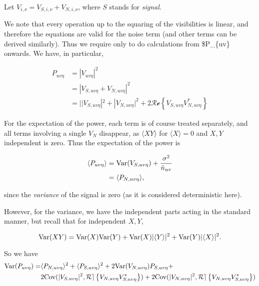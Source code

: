 \documentclass[11pt]{article}
\begin{document}
    Let \(V_{i,\nu} = V_{S,i,\nu} + V_{N,i,\nu}\), where \(S\) stands for
\emph{signal}.

    We note that every operation up to the squaring of the visibilities is
linear, and therefore the equations are valid for the noise term (and
other terms can be derived similarly). Thus we require only to do
calculations from \$\langle P\_\{uv\eta\} \rangle onwards. We have, in
particular,

\begin{align}
    P_{uv\eta} &= |V_{uv\eta}|^2 \\
    &= |V_{S,uv\eta} + V_{N, uv\eta}|^2 \\
    &= ||V_{S, uv\eta}|^2 + |V_{N, uv\eta}|^2 + 2\mathcal{Re}\left\{V_{S, uv\eta}V^*_{N, uv\eta}\right\} 
\end{align}

    For the expectation of the power, each term is of course treated
separately, and all terms involving a single \(V_N\) disappear, as
\(\langle X Y \rangle\) for \(\langle X \rangle = 0\) and \(X,Y\)
independent is zero. Thus the expectation of the power is

\begin{align}
    \langle P_{uv\eta} \rangle &= {\rm Var}(V_{S, uv\eta}) + \frac{\sigma^2}{\tilde{n}_{uv}} \\
    &= \langle P_{N,uv\eta} \rangle,
\end{align}

since the \emph{variance} of the signal is zero (as it is considered
deterministic here).

    However, for the variance, we have the independent parts acting in the
standard manner, but recall that for independent \(X,Y\),

\begin{equation}
    {\rm Var}(XY) = {\rm Var}(X){\rm Var}(Y) + {\rm Var}(X) |\langle Y \rangle|^2 + {\rm Var}(Y) |\langle X \rangle|^2.
\end{equation}

    So we have \begin{align}
    {\rm Var}(P_{uv\eta}) = &\langle P_{N, uv\eta} \rangle^2 + \langle P_{S, uv\eta} \rangle^2 + 2 {\rm Var}(V_{N,uv\eta})P_{S,uv\eta} + \\
        & 2 {\rm Cov}(|V_{S,uv\eta}|^2, \mathcal{Re}\left\{V_{N, uv\eta}V^*_{S, uv\eta}\right\}) + 2 {\rm Cov}(|V_{N,uv\eta}|^2, \mathcal{Re}\left\{V_{N, uv\eta}V^*_{S, uv\eta}\right\}) 
\end{align}
\end{document}
